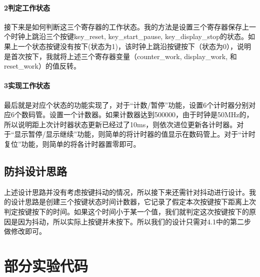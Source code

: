 \documentclass[UTF8]{ctexart}
\begin{document}
\paragraph{2判定工作状态}
接下来是如何判断这三个寄存器的工作状态。我的方法是设置三个寄存器保存上一个时钟上跳沿三个按键key\_reset, key\_start\_pause, key\_display\_stop的状态。如果上一个状态按键没有按下(状态为1)，该时钟上跳沿按键按下（状态为0），说明是首次按下，我就将上述三个寄存器变量（counter\_work, display\_work, 和reset\_work）的值反转。
\paragraph{3实现工作状态}
最后就是对应个状态的功能实现了，对于“计数/暂停”功能，设置6个计时器分别对应6个数码管。设置一个计数器。如果计数器达到500000，由于时钟是50MHz的，所以说明距上次计时器状态更新已经过了10ms，则依次进位更新各计时器。对于“显示暂停/显示继续”功能，则简单的将计时器的值显示在数码管上。对于“计时复位”功能，则简单的将各计时器置零即可。
\subsection{防抖设计思路}
上述设计思路并没有考虑按键抖动的情况，所以接下来还需针对抖动进行设计。我的设计思路是创建三个按键状态时间计数器，它记录了假定本次按键按下距离上次判定按键按下的时间。如果这个时间小于某一个值，我们就判定这次按键按下的原因是因为抖动，所以实际上按键并未按下。所以我们的设计只需对4.1中的第二步做修改即可。

\section{部分实验代码}
\end{document}
